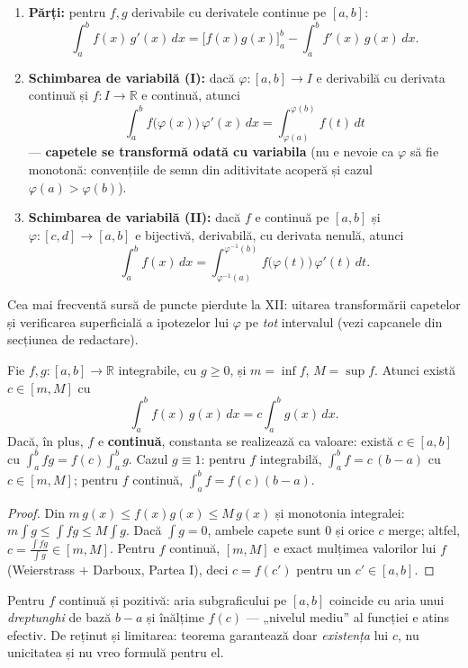 \begin{teorema}
\begin{enumerate}[leftmargin=*, itemsep=2pt]
\item \textbf{Părți:} pentru $f,g$ derivabile cu derivatele continue pe $[a,b]$:
\[
\int_a^b f(x)\,g'(x)\,dx=\big[f(x)g(x)\big]_a^b-\int_a^b f'(x)\,g(x)\,dx.
\]
\item \textbf{Schimbarea de variabilă (I):} dacă $\varphi:[a,b]\to I$ e derivabilă cu derivata continuă și $f:I\to\mathbb{R}$ e continuă, atunci
\[
\int_a^b f\big(\varphi(x)\big)\,\varphi'(x)\,dx=\int_{\varphi(a)}^{\varphi(b)}f(t)\,dt
\]
--- \textbf{capetele se transformă odată cu variabila} (nu e nevoie ca $\varphi$ să fie monotonă: convențiile de semn din aditivitate acoperă și cazul $\varphi(a)>\varphi(b)$).
\item \textbf{Schimbarea de variabilă (II):} dacă $f$ e continuă pe $[a,b]$ și $\varphi:[c,d]\to[a,b]$ e bijectivă, derivabilă, cu derivata nenulă, atunci
\[
\int_a^b f(x)\,dx=\int_{\varphi^{-1}(a)}^{\varphi^{-1}(b)}f\big(\varphi(t)\big)\,\varphi'(t)\,dt.
\]
\end{enumerate}
Cea mai frecventă sursă de puncte pierdute la XII: uitarea transformării capetelor și verificarea superficială a ipotezelor lui $\varphi$ pe \emph{tot} intervalul (vezi capcanele din secțiunea de redactare).
\end{teorema}

\begin{teorema}
Fie $f,g:[a,b]\to\mathbb{R}$ integrabile, cu $g\ge0$, și $m=\inf f$, $M=\sup f$. Atunci există $c\in[m,M]$ cu
\[
\int_a^b f(x)\,g(x)\,dx=c\int_a^b g(x)\,dx.
\]
Dacă, în plus, $f$ e \textbf{continuă}, constanta se realizează ca valoare: există $c\in[a,b]$ cu $\int_a^b fg=f(c)\int_a^b g$. Cazul $g\equiv1$: pentru $f$ integrabilă, $\int_a^b f=c\,(b-a)$ cu $c\in[m,M]$; pentru $f$ continuă, $\int_a^b f=f(c)(b-a)$.
\end{teorema}
\begin{proof}
Din $m\,g(x)\le f(x)g(x)\le M\,g(x)$ și monotonia integralei: $m\int g\le\int fg\le M\int g$. Dacă $\int g=0$, ambele capete sunt $0$ și orice $c$ merge; altfel, $c=\frac{\int fg}{\int g}\in[m,M]$. Pentru $f$ continuă, $[m,M]$ e exact mulțimea valorilor lui $f$ (Weierstrass $+$ Darboux, Partea I), deci $c=f(c')$ pentru un $c'\in[a,b]$.
\end{proof}

\begin{obs}
Pentru $f$ continuă și pozitivă: aria subgraficului pe $[a,b]$ coincide cu aria unui \emph{dreptunghi} de bază $b-a$ și înălțime $f(c)$ --- „nivelul mediu'' al funcției e atins efectiv. De reținut și limitarea: teorema garantează doar \emph{existența} lui $c$, nu unicitatea și nu vreo formulă pentru el.
\end{obs}

